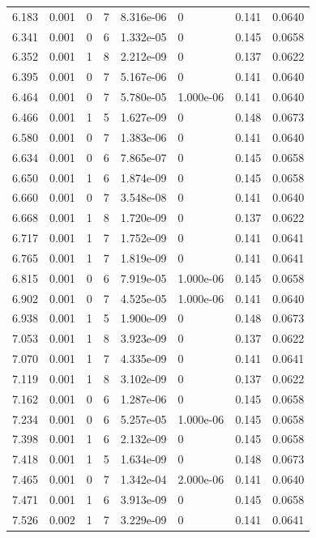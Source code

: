 \documentclass[preview]{standalone}
\begin{document}
{{{\begin{tabular}{L{1.2cm}C{1.2cm} C{0.3cm}C{0.5cm} C{1.4cm}C{1.4cm} C{1.4cm}C{1.4cm}}
  6.183  &  0.001  & 0     &  7 &  8.316e-06  & 0  & 0.141 &  0.0640   \\ 
  6.341  &  0.001  & 0     &  6 &  1.332e-05  & 0  & 0.145 &  0.0658   \\ 
  6.352  &  0.001  & 1     &  8 &  2.212e-09  & 0  & 0.137 &  0.0622   \\ 
  6.395  &  0.001  & 0     &  7 &  5.167e-06  & 0  & 0.141 &  0.0640   \\ 
  6.464  &  0.001  & 0     &  7 &  5.780e-05  & 1.000e-06  & 0.141 &  0.0640   \\ 
  6.466  &  0.001  & 1     &  5 &  1.627e-09  & 0  & 0.148 &  0.0673   \\ 
  6.580  &  0.001  & 0     &  7 &  1.383e-06  & 0  & 0.141 &  0.0640   \\ 
  6.634  &  0.001  & 0     &  6 &  7.865e-07  & 0  & 0.145 &  0.0658   \\ 
  6.650  &  0.001  & 1     &  6 &  1.874e-09  & 0  & 0.145 &  0.0658   \\ 
  6.660  &  0.001  & 0     &  7 &  3.548e-08  & 0  & 0.141 &  0.0640   \\ 
  6.668  &  0.001  & 1     &  8 &  1.720e-09  & 0  & 0.137 &  0.0622   \\ 
  6.717  &  0.001  & 1     &  7 &  1.752e-09  & 0  & 0.141 &  0.0641   \\ 
  6.765  &  0.001  & 1     &  7 &  1.819e-09  & 0  & 0.141 &  0.0641   \\ 
  6.815  &  0.001  & 0     &  6 &  7.919e-05  & 1.000e-06  & 0.145 &  0.0658   \\ 
  6.902  &  0.001  & 0     &  7 &  4.525e-05  & 1.000e-06  & 0.141 &  0.0640   \\ 
  6.938  &  0.001  & 1     &  5 &  1.900e-09  & 0  & 0.148 &  0.0673   \\ 
  7.053  &  0.001  & 1     &  8 &  3.923e-09  & 0  & 0.137 &  0.0622   \\ 
  7.070  &  0.001  & 1     &  7 &  4.335e-09  & 0  & 0.141 &  0.0641   \\ 
  7.119  &  0.001  & 1     &  8 &  3.102e-09  & 0  & 0.137 &  0.0622   \\ 
  7.162  &  0.001  & 0     &  6 &  1.287e-06  & 0  & 0.145 &  0.0658   \\ 
  7.234  &  0.001  & 0     &  6 &  5.257e-05  & 1.000e-06  & 0.145 &  0.0658   \\ 
  7.398  &  0.001  & 1     &  6 &  2.132e-09  & 0  & 0.145 &  0.0658   \\ 
  7.418  &  0.001  & 1     &  5 &  1.634e-09  & 0  & 0.148 &  0.0673   \\ 
  7.465  &  0.001  & 0     &  7 &  1.342e-04  & 2.000e-06  & 0.141 &  0.0640   \\ 
  7.471  &  0.001  & 1     &  6 &  3.913e-09  & 0  & 0.145 &  0.0658   \\ 
  7.526  &  0.002  & 1     &  7 &  3.229e-09  & 0  & 0.141 &  0.0641   \\ 
\hline 
\end{tabular} 

}}}
\end{document}
